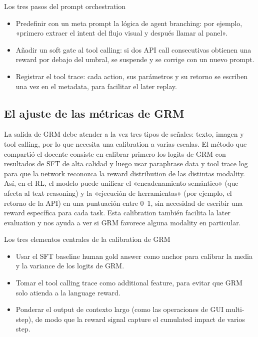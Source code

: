 \documentclass[a4paper]{article}
\begin{document}
\begin{knowledgebox}{Los tres pasos del prompt orchestration}
\begin{itemize}
    \item Predefinir con un meta prompt la lógica de agent branching: por ejemplo, «primero extraer el intent del flujo visual y después llamar al panel».
    \item Añadir un soft gate al tool calling: si dos API call consecutivas obtienen una reward por debajo del umbral, se suspende y se corrige con un nuevo prompt.
    \item Registrar el tool trace: cada action, sus parámetros y su retorno se escriben una vez en el metadata, para facilitar el later replay.
\end{itemize}
\end{knowledgebox}

\subsection{El ajuste de las métricas de GRM}
La salida de GRM debe atender a la vez tres tipos de señales: texto, imagen y tool calling, por lo que necesita una calibration a varias escalas. El método que compartió el docente consiste en calibrar primero los logits de GRM con resultados de SFT de alta calidad y luego usar paraphrase data y tool trace log para que la network reconozca la reward distribution de las distintas modality. Así, en el RL, el modelo puede unificar el «encadenamiento semántico» (que afecta al text reasoning) y la «ejecución de herramientas» (por ejemplo, el retorno de la API) en una puntuación entre 0~1, sin necesidad de escribir una reward específica para cada task. Esta calibration también facilita la later evaluation y nos ayuda a ver si GRM favorece alguna modality en particular.

\begin{knowledgebox}{Los tres elementos centrales de la calibration de GRM}
\begin{itemize}
    \item Usar el SFT baseline human gold answer como anchor para calibrar la media y la variance de los logits de GRM.
    \item Tomar el tool calling trace como additional feature, para evitar que GRM solo atienda a la language reward.
    \item Ponderar el output de contexto largo (como las operaciones de GUI multi-step), de modo que la reward signal capture el cumulated impact de varios step.
\end{itemize}
\end{knowledgebox}
\end{document}
